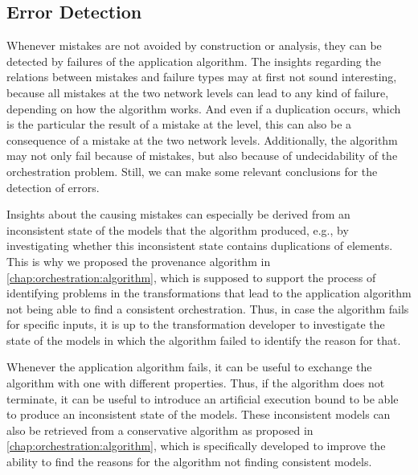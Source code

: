 

\subsection{Error Detection}

Whenever mistakes are not avoided by construction or analysis, they can be detected by failures of the application algorithm.
The insights regarding the relations between mistakes and failure types may at first not sound interesting, because all mistakes at the two network levels can lead to any kind of failure, depending on how the algorithm works.
And even if a duplication occurs, which is the particular the result of a mistake at the \leveltransformation level, this can also be a consequence of a mistake at the two network levels.
Additionally, the algorithm may not only fail because of mistakes, but also because of undecidability of the orchestration problem.
Still, we can make some relevant conclusions for the detection of errors.

Insights about the causing mistakes can especially be derived from an inconsistent state of the models that the algorithm produced, e.g., by investigating whether this inconsistent state contains duplications of elements.
This is why we proposed the provenance algorithm in \autoref{chap:orchestration:algorithm}, which is supposed to support the process of identifying problems in the transformations that lead to the application algorithm not being able to find a consistent orchestration.
Thus, in case the algorithm fails for specific inputs, it is up to the transformation developer to investigate the state of the models in which the algorithm failed to identify the reason for that.

Whenever the application algorithm fails, it can be useful to exchange the algorithm with one with different properties.
Thus, if the algorithm does not terminate, it can be useful to introduce an artificial execution bound to be able to produce an inconsistent state of the models.
These inconsistent models can also be retrieved from a conservative algorithm as proposed in \autoref{chap:orchestration:algorithm}, which is specifically developed to improve the ability to find the reasons for the algorithm not finding consistent models.

